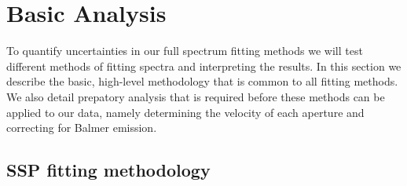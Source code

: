 \section{Basic Analysis}
\label{891_2:sec:anal}

To quantify uncertainties in our full spectrum fitting methods we will
test different methods of fitting spectra and interpreting the
results. In this section we describe the basic, high-level methodology
that is common to all fitting methods. We also detail prepatory
analysis that is required before these methods can be applied to our
data, namely determining the velocity of each aperture and correcting
for Balmer emission.



\subsection{SSP fitting methodology}
\label{891_2:sec:SSP_method}

